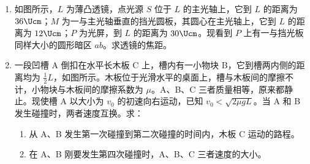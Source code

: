 \documentclass[\gkver]{gaokaozhenti}
\begin{document}
\begin{enumerate}
{

设粒子进入电场作减速运动的最大路程为 $l$，加速度为 $a$，由牛顿第二定律和运动学公式得 $qE=ma$ ④

$v^{2}=2al$ ⑤

粒子运动的总路程 $s=2\pi R+2l$ ⑥

由①、②、④、⑤、⑥式，得 $s=\frac{\pi L}{2}+\frac{qB^{2}L^{2}}{16mE}$ ⑦
}

\item
如图所示，$L$ 为薄凸透镜，点光源 $S$ 位于 $L$ 的主光轴上，它到 $L$ 的距离为 $36\Ucm$；$M$ 为一与主光轴垂直的挡光圆板，其圆心在主光轴上，它到 $L$ 的距离为 $12\Ucm$；$P$ 为光屏，到 $L$ 的距离为 $30\Ucm$。现看到 $P$ 上有一与挡光板同样大小的圆形暗区 $ab$。求透镜的焦距。



\item
一段凹槽 A 倒扣在水平长木板 C 上，槽内有一小物块 B，它到槽两内侧的距离均为 $\frac{1}{2}L$，如图所示。木板位于光滑水平的桌面上，槽与木板间的摩擦不计，小物块与木板间的摩擦系数为 $\mu$。A、B、C 三者质量相等，原来都静止。现使槽 A 以大小为 $v_{0}$ 的初速向右运动，已知 $v_{0}<\sqrt{2\mu gL}$。当 A 和 B 发生碰撞时，两者速度互换。求：
\begin{enumerate}
	\item
	从 A、B 发生第一次碰撞到第二次碰撞的时间内，木板 C 运动的路程。
	\item
	在 A、B 刚要发生第四次碰撞时，A、B、C 三者速度的大小。
\end{enumerate}


\end{enumerate}
\end{document}
